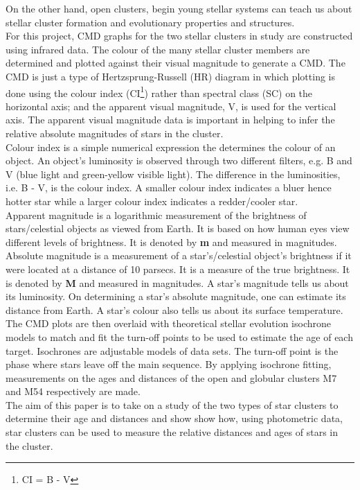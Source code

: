 \documentclass[12pt]{article}
\begin{document}
	On the other hand, open clusters, begin young stellar systems can teach us about stellar cluster formation and evolutionary properties and structures.\\
	For this project, CMD graphs for the two stellar clusters in study are constructed using infrared data. The colour of the many stellar cluster members are determined and plotted against their visual magnitude to generate a CMD. The CMD is just a type of Hertzsprung-Russell (HR) diagram in which plotting is done using the colour index (CI\footnote[1]{CI = B - V}) rather than spectral class (SC) on the horizontal axis; and the apparent visual magnitude, V, is used for the vertical axis. The apparent visual magnitude data is important in helping to infer the relative absolute magnitudes of stars in the cluster.\\
	Colour index is a simple numerical expression the determines the colour of an object. An object's luminosity is observed through two different filters, e.g. B and V (blue light and green-yellow visible light). The difference in the luminosities, i.e. B - V, is the colour index. A smaller colour index indicates a bluer hence hotter star while a larger colour index indicates a redder/cooler star.\\
	Apparent magnitude is a logarithmic measurement of the brightness of stars/celestial objects as viewed from Earth. It is based on how human eyes view different levels of brightness. It is denoted by \textbf{m} and measured in magnitudes.\\
	Absolute magnitude is a measurement of a star's/celestial object's brightness if it were located at a distance of 10 parsecs. It is a measure of the true brightness. It is denoted by \textbf{M} and measured in magnitudes. A star's magnitude tells us about its luminosity. On determining a star's absolute magnitude, one can estimate its distance from Earth. A star's colour also tells us about its surface temperature.\\
	The CMD plots are then overlaid with theoretical stellar evolution isochrone models to match and fit the turn-off points to be used to estimate the age of each target. Isochrones are adjustable models of data  sets. The turn-off point is the phase where stars leave off the main sequence. By applying isochrone fitting, measurements on the ages and distances of the open and globular clusters M7 and M54 respectively are made.\\
	The aim of this paper is to take on a study of the two types of star clusters to determine their age and distances and show show how, using photometric data, star clusters can be used to measure the relative distances and ages of stars in the cluster.
	
\end{document}
